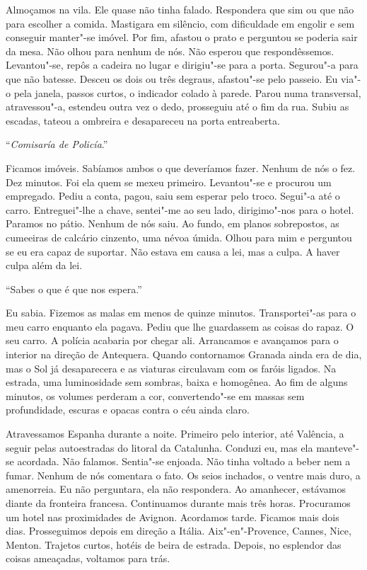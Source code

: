 Almoçamos na vila. Ele quase não tinha falado. Respondera que sim ou que
não para escolher a comida. Mastigara em silêncio, com dificuldade em
engolir e sem conseguir manter"-se imóvel. Por fim, afastou o prato e
perguntou se poderia sair da mesa. Não olhou para nenhum de nós. Não
esperou que respondêssemos. Levantou"-se, repôs a cadeira no lugar e
dirigiu"-se para a porta. Segurou"-a para que não batesse. Desceu os
dois ou três degraus, afastou"-se pelo passeio. Eu via"-o pela janela,
passos curtos, o indicador colado à parede. Parou numa transversal,
atravessou"-a, estendeu outra vez o dedo, prosseguiu até o fim da rua.
Subiu as escadas, tateou a ombreira e desapareceu na porta entreaberta.

``\emph{Comisaría de Policía}.''

Ficamos imóveis. Sabíamos ambos o que deveríamos fazer. Nenhum de nós o
fez. Dez minutos. Foi ela quem se mexeu primeiro. Levantou"-se e
procurou um empregado. Pediu a conta, pagou, saiu sem esperar pelo
troco. Segui"-a até o carro. Entreguei"-lhe a chave, sentei"-me ao seu
lado, dirigimo"-nos para o hotel. Paramos no pátio. Nenhum de nós saiu.
Ao fundo, em planos sobrepostos, as cumeeiras de calcário cinzento, uma
névoa úmida. Olhou para mim e perguntou se eu era capaz de suportar.
Não estava em causa a lei, mas a culpa. A haver culpa além da lei.

``Sabes o que é que nos espera.''

Eu sabia. Fizemos as malas em menos de quinze minutos. Transportei"-as
para o meu carro enquanto ela pagava. Pediu que lhe guardassem as coisas
do rapaz. O seu carro. A polícia acabaria por chegar ali. Arrancamos e
avançamos para o interior na direção de Antequera. Quando contornamos
Granada ainda era de dia, mas o Sol já desaparecera e as viaturas
circulavam com os faróis ligados. Na estrada, uma luminosidade sem
sombras, baixa e homogênea. Ao fim de alguns minutos, os volumes
perderam a cor, convertendo"-se em massas sem profundidade, escuras e
opacas contra o céu ainda claro.

Atravessamos Espanha durante a noite. Primeiro pelo interior, até
Valência, a seguir pelas autoestradas do litoral da Catalunha. Conduzi
eu, mas ela manteve"-se acordada. Não falamos. Sentia"-se enjoada. Não
tinha voltado a beber nem a fumar. Nenhum de nós comentara o fato. Os
seios inchados, o ventre mais duro, a amenorreia. Eu não perguntara, ela
não respondera. Ao amanhecer, estávamos diante da fronteira francesa.
Continuamos durante mais três horas. Procuramos um hotel nas
proximidades de Avignon. Acordamos tarde. Ficamos mais dois dias.
Prosseguimos depois em direção a Itália. Aix"-en"-Provence, Cannes,
Nice, Menton. Trajetos curtos, hotéis de beira de estrada. Depois, no
esplendor das coisas ameaçadas, voltamos para trás.
